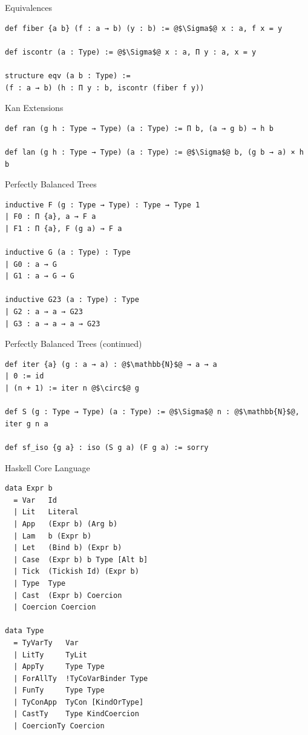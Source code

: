 \documentclass[pdf]{beamer}
\begin{document}
\begin{frame}[fragile]{Equivalences}
  \begin{verbatim}
def fiber {a b} (f : a → b) (y : b) := @$\Sigma$@ x : a, f x = y

def iscontr (a : Type) := @$\Sigma$@ x : a, Π y : a, x = y

structure eqv (a b : Type) :=
(f : a → b) (h : Π y : b, iscontr (fiber f y))
  \end{verbatim}
\end{frame}

\begin{frame}[fragile]{Kan Extensions}
  \begin{verbatim}
def ran (g h : Type → Type) (a : Type) := Π b, (a → g b) → h b

def lan (g h : Type → Type) (a : Type) := @$\Sigma$@ b, (g b → a) × h b
  \end{verbatim}
\end{frame}

\begin{frame}[fragile]{Perfectly Balanced Trees}
  \begin{verbatim}
inductive F (g : Type → Type) : Type → Type 1
| F0 : Π {a}, a → F a
| F1 : Π {a}, F (g a) → F a

inductive G (a : Type) : Type
| G0 : a → G
| G1 : a → G → G

inductive G23 (a : Type) : Type
| G2 : a → a → G23
| G3 : a → a → a → G23
  \end{verbatim}
\end{frame}

\begin{frame}[fragile]{Perfectly Balanced Trees (continued)}
  \begin{verbatim}
def iter {a} (g : a → a) : @$\mathbb{N}$@ → a → a
| 0 := id
| (n + 1) := iter n @$\circ$@ g

def S (g : Type → Type) (a : Type) := @$\Sigma$@ n : @$\mathbb{N}$@, iter g n a

def sf_iso {g a} : iso (S g a) (F g a) := sorry
  \end{verbatim}
\end{frame}

\begin{frame}[fragile]{Haskell Core Language}
  \begin{verbatim}
data Expr b
  = Var   Id
  | Lit   Literal
  | App   (Expr b) (Arg b)
  | Lam   b (Expr b)
  | Let   (Bind b) (Expr b)
  | Case  (Expr b) b Type [Alt b]
  | Tick  (Tickish Id) (Expr b)
  | Type  Type
  | Cast  (Expr b) Coercion
  | Coercion Coercion

data Type
  = TyVarTy   Var
  | LitTy     TyLit
  | AppTy     Type Type
  | ForAllTy  !TyCoVarBinder Type
  | FunTy     Type Type
  | TyConApp  TyCon [KindOrType]
  | CastTy    Type KindCoercion
  | CoercionTy Coercion
  \end{verbatim}
\end{frame}
\end{document}
